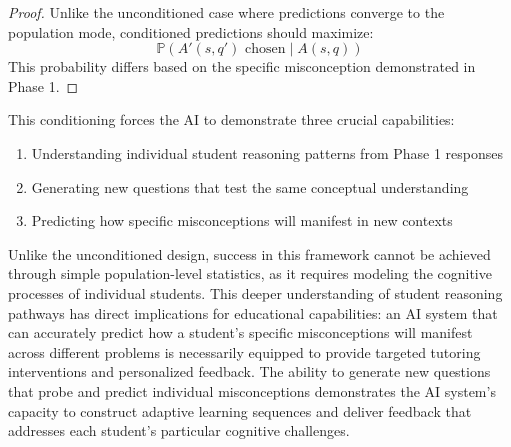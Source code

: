 \begin{proof}
Unlike the unconditioned case where predictions converge to the population mode, conditioned predictions should maximize:
\[\mathbb{P}(A'(s,q') \text{ chosen} \mid A(s,q))\]
This probability differs based on the specific misconception demonstrated in Phase 1.
\end{proof}

This conditioning forces the AI to demonstrate three crucial capabilities:
\begin{enumerate}
    \item Understanding individual student reasoning patterns from Phase 1 responses
    \item Generating new questions that test the same conceptual understanding
    \item Predicting how specific misconceptions will manifest in new contexts
\end{enumerate}

Unlike the unconditioned design, success in this framework cannot be achieved through simple population-level statistics, as it requires modeling the cognitive processes of individual students. This deeper understanding of student reasoning pathways has direct implications for educational capabilities: an AI system that can accurately predict how a student's specific misconceptions will manifest across different problems is necessarily equipped to provide targeted tutoring interventions and personalized feedback. The ability to generate new questions that probe and predict individual misconceptions demonstrates the AI system's capacity to construct adaptive learning sequences and deliver feedback that addresses each student's particular cognitive challenges.